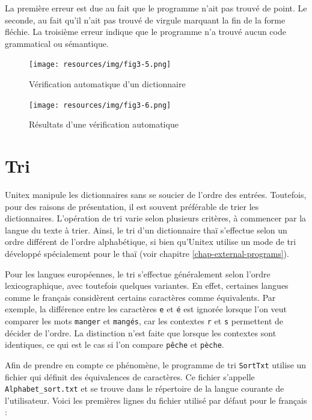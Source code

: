 \bigskip
\noindent La première erreur est due au fait que le programme n’ait pas trouvé de point.
Le seconde, au fait qu’il n’ait pas trouvé de virgule marquant la fin de la forme fléchie.
La troisième erreur indique que le programme n’a trouvé aucun code grammatical ou sémantique.




\begin{figure}[!ht]
\begin{center}
\texttt{[image: resources/img/fig3-5.png]}
\caption{Vérification automatique d’un dictionnaire\label{fig-dictionary-checking}}
\end{center}
\end{figure}

\begin{figure}[!p]
\begin{center}
\texttt{[image: resources/img/fig3-6.png]}
\caption{Résultats d’une vérification automatique\label{fig-dictionary-checking-results}}
\end{center}
\end{figure}


\section{Tri}

Unitex manipule les dictionnaires sans se soucier de l’ordre des entrées. Toutefois, pour
des raisons de présentation, il est souvent préférable de trier les dictionnaires. L’opération
de tri varie selon plusieurs critères, à commencer par la langue du texte à trier. Ainsi, le
tri d’un dictionnaire thaï s’effectue selon un ordre différent de l’ordre alphabétique, si bien
qu’Unitex utilise un mode de tri développé spécialement pour le thaï (voir chapitre
 \ref{chap-external-programs}).

\bigskip
\noindent Pour les langues européennes, le tri s’effectue généralement selon l’ordre
lexicographique, avec toutefois quelques variantes. En effet, certaines langues comme le français
considèrent certains caractères comme équivalents. Par exemple, la différence entre les caractères
\verb+e+ et \texttt{é} est ignorée lorsque l’on veut comparer les mots \verb+manger+ et
\texttt{mangés}, car les contextes \verb+r+ et \verb+s+ permettent de décider de l’ordre. La
distinction n’est faite que lorsque les contextes sont identiques, ce qui est le cas si l’on
compare \texttt{pêche} et \texttt{pèche}.

\bigskip {}
\noindent
Afin de prendre en compte ce phénomène, le programme de tri \verb+SortTxt+  
 utilise un fichier qui définit des
équivalences de caractères.   Ce fichier s’appelle
\verb+Alphabet_sort.txt+  et se trouve dans le répertoire
de la langue courante de l’utilisateur. Voici les premières lignes du fichier utilisé par défaut
pour le français :


